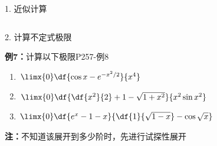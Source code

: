\begin{frame}{1. 近似计算}
\begin{columns}
\begin{center}
			\end{center}
	\end{columns}
\end{frame}

\begin{frame}{2. 计算不定式极限}
	\linespread{1.2}\pause 
	\begin{exampleblock}{{\bf 例7：}计算以下极限\hfill P257-例8}
		\begin{enumerate}
		  \item $\limx{0}\df{\cos x-e^{-x^2/2}}{x^4}$\pause 
		  \item $\limx{0}\df{\df{x^2}{2}+1-\sqrt{1+x^2}}{x^2\sin x^2}$\pause 
		  \item $\limx{0}\df{e^x-1-x}{\df{1}{\sqrt{1-x}}-\cos\sqrt x}$\pause 
		\end{enumerate}
	\end{exampleblock}
	{\bf 注：}\alert{不知道该展开到多少阶时，先进行试探性展开}
\end{frame}

